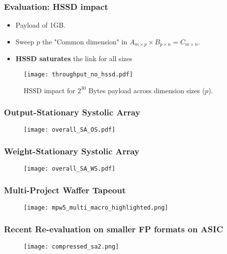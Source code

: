 \begin{frame}
    \frametitle{Evaluation: HSSD impact}
  \begin{itemize}
        \item<1-> Payload of 1GB.
	\item<1-> Sweep \( p \) the "Common dimension" in \( A_{m \times p} \times B_{p \times n} = C_{m \times n} \).
	\item<2-> \textbf{HSSD saturates} the link for all sizes
    \end{itemize}

    \vspace{0.5cm}

    \begin{figure}
        \centering
        \texttt{[image: throughput\_no\_hssd.pdf]} %
        \vspace{-0.5cm}
        \caption{HSSD impact for $2^{30}$ Bytes payload across dimension sizes ($p$).}
    \end{figure}

\end{frame}

\begin{frame}
    \frametitle{Output-Stationary Systolic Array}
    \begin{figure}[H]
        \centering
        \texttt{[image: overall\_SA\_OS.pdf]}
    \end{figure}
\end{frame}

\begin{frame}
    \frametitle{Weight-Stationary Systolic Array}
    \begin{figure}[H]
        \centering
        \texttt{[image: overall\_SA\_WS.pdf]}
    \end{figure}
\end{frame}

\begin{frame}
    \frametitle{Multi-Project Waffer Tapeout}
    \begin{figure}[H]
        \centering
        \texttt{[image: mpw5\_multi\_macro\_highlighted.png]}
    \end{figure}
\end{frame}

\begin{frame}
    \frametitle{Recent Re-evaluation on smaller FP formats on ASIC}
    \begin{figure}[H]
        \centering
        \texttt{[image: compressed\_sa2.png]}
    \end{figure}
\end{frame}

